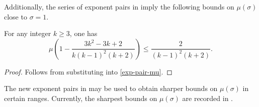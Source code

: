 \literature
{}

Additionally, the series of exponent pairs in  imply the following bounds on $\mu(\sigma)$ close to $\sigma = 1$. 
\begin{theorem}\label{hb_mu_bounds}
For any integer $k \ge 3$, one has
\[
\mu\left(1 - \frac{3 k^2 - 3 k + 2}{k(k - 1)^2(k + 2)}\right)\le \frac{2}{(k - 1)^2(k + 2)}.
\]
\end{theorem}
\begin{proof}
Follows from substituting  into \eqref{exp-pair-mu}.
\end{proof}


The new exponent pairs in  may be used to obtain sharper bounds on $\mu(\sigma)$ in certain ranges. Currently, the sharpest bounds on $\mu(\sigma)$ are recorded in .


